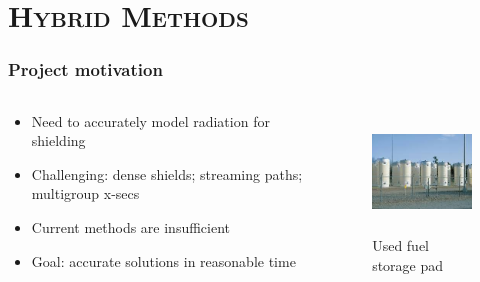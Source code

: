 \documentclass[xcolor=x11names,compress, handout]{beamer}
\renewcommand{\(}{\begin{columns}}
\renewcommand{\)}{\end{columns}}
\newcommand{\<}[1]{\begin{column}{#1}}
\renewcommand{\>}{\end{column}}
\begin{document}
\section{\scshape Hybrid Methods}
\begin{frame}[fragile]
  \frametitle{Project motivation}

\begin{columns}
  \begin{column}{0.55\textwidth}
	\begin{itemize}
	\item Need to accurately model radiation for shielding
	\item \alert{Challenging}: dense shields; streaming paths; multigroup x-secs
	\item Current methods are insufficient
	\item \alert{Goal}: accurate solutions in reasonable time
	\end{itemize}
  \end{column}
  \begin{column}{0.45\textwidth}
  	\begin{figure}
  	\begin{center}
  		\includegraphics[height=1.25in,clip]{../figs/isfsi}
		\caption{Used fuel storage pad}
	\end{center}
  	\end{figure}
  \end{column}
\end{columns}

\end{frame}
\end{document}
